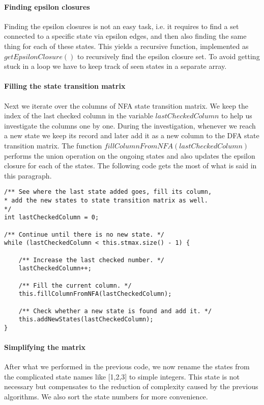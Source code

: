 \documentclass[
12pt, %
a4paper, %
oneside, %
headinclude,footinclude, %
BCOR5mm, %
]{scrartcl}
\begin{document}
\paragraph{Finding epsilon closures}
Finding the epsilon closures is not an easy task, i.e. it requires to find a set connected to a specific state via epsilon edges, and then also finding the same thing for each of these states. This yields a recursive function, implemented as $getEpsilonClosure()$ to recursively find the epsilon closure set. To avoid getting stuck in a loop we have to keep track of seen states in a separate array.

\paragraph{Filling the state transition matrix}
Next we iterate over the columns of NFA state transition matrix. We keep the index of the last checked column in the variable $lastCheckedColumn$ to help us investigate the columns one by one. During the investigation, whenever we reach a new state we keep its record and later add it as a new column to the DFA state transition matrix. The function $fillColumnFromNFA(lastCheckedColumn)$ performs the union operation on the ongoing states and also updates the epsilon closure for each of the states. The following code gets the most of what is said in this paragraph.

\begin{lstlisting}
/** See where the last state added goes, fill its column,
* add the new states to state transition matrix as well.
*/
int lastCheckedColumn = 0;

/** Continue until there is no new state. */
while (lastCheckedColumn < this.stmax.size() - 1) {

	/** Increase the last checked number. */
	lastCheckedColumn++;
	
	/** Fill the current column. */
	this.fillColumnFromNFA(lastCheckedColumn);
	
	/** Check whether a new state is found and add it. */
	this.addNewStates(lastCheckedColumn);
}
\end{lstlisting}

\paragraph{Simplifying the matrix} After what we performed in the previous code, we now rename the states from the complicated state names like [1,2,3] to simple integers. This state is not necessary but compensates to the reduction of complexity caused by the previous algorithms. We also sort the state numbers for more convenience.
\end{document}

